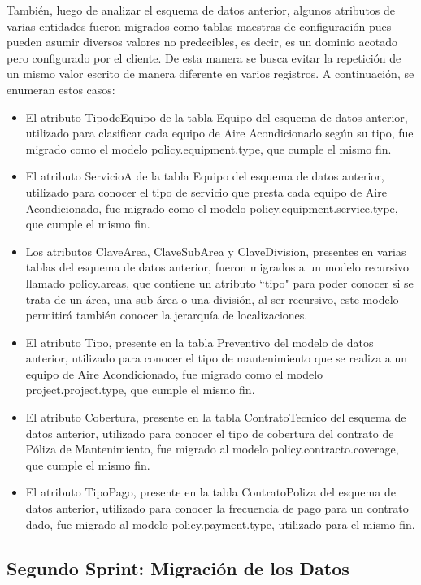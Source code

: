 \documentclass[a4paper, 12pt]{article}
\begin{document}
También, luego de analizar el esquema de datos anterior, algunos atributos de varias entidades fueron migrados como tablas maestras de configuración pues pueden asumir diversos valores no predecibles, es decir, es un dominio acotado pero configurado por el cliente. De esta manera se busca evitar la repetición de un mismo valor escrito de manera diferente en varios registros. A continuación, se enumeran estos casos:
\begin{itemize}
    \item El atributo TipodeEquipo de la tabla Equipo del esquema de datos anterior, utilizado para clasificar cada equipo de Aire Acondicionado según su tipo, fue migrado como el modelo policy.equipment.type, que cumple el mismo fin.
    \item El atributo ServicioA de la tabla Equipo del esquema de datos anterior, utilizado para conocer el tipo de servicio que presta cada equipo de Aire Acondicionado, fue migrado como el modelo policy.equipment.service.type, que cumple el mismo fin.
    \item Los atributos ClaveArea, ClaveSubArea y ClaveDivision, presentes en varias tablas del esquema de datos anterior, fueron migrados a un modelo recursivo llamado policy.areas, que contiene un atributo ``tipo" para poder conocer si se trata de un área, una sub-área o una división, al ser recursivo, este modelo permitirá también conocer la jerarquía de localizaciones.
    \item El atributo Tipo, presente en la tabla Preventivo del modelo de datos anterior, utilizado para conocer el tipo de mantenimiento que se realiza a un equipo de Aire Acondicionado, fue migrado como el modelo project.project.type, que cumple el mismo fin.
    \item El atributo Cobertura, presente en la tabla ContratoTecnico del esquema de datos anterior, utilizado para conocer el tipo de cobertura del contrato de Póliza de Mantenimiento, fue migrado al modelo policy.contracto.coverage, que cumple el mismo fin.
    \item El atributo TipoPago, presente en la tabla ContratoPoliza del esquema de datos anterior, utilizado para conocer la frecuencia de pago para un contrato dado, fue migrado al modelo policy.payment.type, utilizado para el mismo fin.
\end{itemize}

\subsection{Segundo Sprint: Migración de los Datos}
\end{document}
